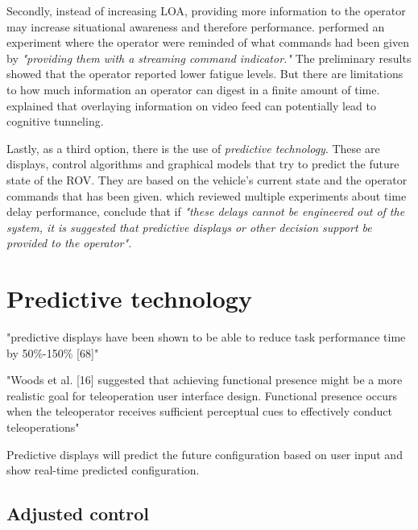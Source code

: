 Secondly, instead of increasing LOA, providing more information to the operator may increase situational awareness and therefore performance. \citep{Miller2005} performed an experiment where the operator were reminded of what commands had been given by \emph{"providing them with a streaming command indicator."} The preliminary results showed that the operator reported lower fatigue levels. But there are limitations to how much information an operator can digest in a finite amount of time. \citep{Chen2007} explained that overlaying information on video feed can potentially lead to cognitive tunneling.

Lastly, as a third option, there is the use of \emph{predictive technology}. These are displays, control algorithms and graphical models that try to predict the future state of the ROV. They are based on the vehicle's current state and the operator commands that has been given. \citep{Chen2007} which reviewed multiple experiments about time delay performance, conclude that if \emph{"these delays cannot be engineered out of the system, it is suggested that predictive displays or other decision support be provided to the operator".}


\section{Predictive technology}




\citep{Chen2007} "predictive displays have been shown to be able to reduce task performance time by 50\%-150\% [68]"


\citep{Chen2007} "Woods et al. [16] suggested that achieving functional presence might be a more realistic goal for teleoperation user interface design. Functional presence occurs when the teleoperator receives sufficient perceptual cues to effectively conduct teleoperations"

Predictive displays will predict the future configuration based on user input and show real-time predicted configuration.

\subsection{Adjusted control}


